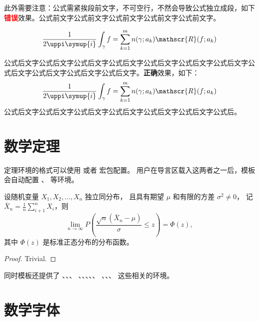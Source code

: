 此外需要注意：公式需紧挨段前文字，不可空行，不然会导致公式独立成段，如下\textcolor{red}{\textbf{错误}}效果。公式前文字公式前文字公式前文字公式前文字公式前文字。

\begin{equation}
  \frac{1}{2 \uppi \symup{i}} \int_\gamma f = \sum_{k=1}^m n(\gamma; a_k) \mathscr{R}(f; a_k)
  \label{eq:example}
\end{equation}

公式后文字公式后文字公式后文字公式后文字公式后文字公式后文字公式后文字公式后文字公式后文字公式后文字公式后文字。\textbf{正确}效果，如下：
\begin{equation}
  \frac{1}{2 \uppi \symup{i}} \int_\gamma f = \sum_{k=1}^m n(\gamma; a_k) \mathscr{R}(f; a_k)
  \label{eq:example}
\end{equation}
公式后文字公式后文字公式后文字公式后文字公式后文字公式后文字公式后。

\section{数学定理}

定理环境的格式可以使用  或者  宏包配置。
用户在导言区载入这两者之一后，模板会自动配置 、 等环境。

\begin{theorem}
  设随机变量 $X_1, X_2, \dots, X_n$ 独立同分布， 且具有期望 $\mu$ 和有限的方差 $\sigma^2 \ne 0$，
  记 $\bar{X}_n = \frac{1}{n} \sum_{i+1}^n X_i$，则
  \begin{equation}
    \lim_{n \to \infty} P \left(\frac{\sqrt{n} \left( \bar{X}_n - \mu \right)}{\sigma} \le z \right) = \Phi(z),
  \end{equation}
  其中 $\Phi(z)$ 是标准正态分布的分布函数。
\end{theorem}
\begin{proof}
  Trivial.
\end{proof}

同时模板还提供了 、、、
、、、、、
、、、 这些相关的环境。

\section{数学字体}

